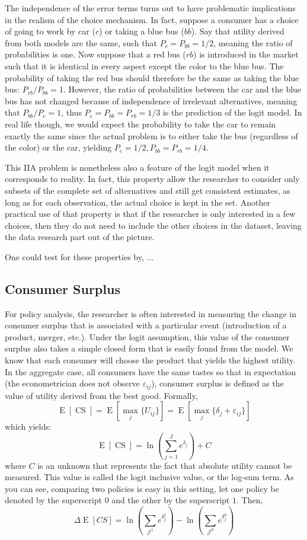 \documentclass[12pt]{report}
\newcommand{\E}[1]{\operatorname{E}\left[#1\right]}
\begin{document}
The independence of the error terms turns out to have problematic implications in the realism of the choice mechanism. In fact, suppose a consumer has a choice of going to work by car ($c$) or taking a blue bus ($bb$). Say that utility derived from both models are the same, such that $P_c = P_{bb} = 1/2$, meaning the ratio of probabilities is one. Now suppose that a red bus ($rb$) is introduced in the market such that it is identical in every aspect except the color to the blue bus. The probability of taking the red bus should therefore be the same as taking the blue bus: $P_{rb}/P_{bb} = 1$. However, the ratio of probabilities between the car and the blue bus has not changed because of independence of irrelevant alternatives, meaning that $P_{bb}/P_{c} = 1$, thus $P_c = P_{bb} = P_{rb} = 1/3$ is the prediction of the logit model. In real life though, we would expect the probability to take the car to remain exactly the same since the actual problem is to either take the bus (regardless of the color) or the car, yielding $P_c = 1/2, P_{bb}=P_{rb} = 1/4 $.

This IIA problem is nonetheless also a feature of the logit model when it corresponds to reality. In fact, this property allow the researcher to consider only subsets of the complete set of alternatives and still get consistent estimates, as long as for each observation, the actual choice is kept in the set. Another practical use of that property is that if the researcher is only interested in a few choices, then they do not need to include the other choices in the dataset, leaving the data research part out of the picture.

One could test for these properties by, ...

\subsection{Consumer Surplus}

For policy analysis, the researcher is often interested in measuring the change in consumer surplus that is associated with a particular event (introduction of a product, merger, etc.). Under the logit assumption, this value of the consumer surplus also takes a simple closed form that is easily found from the model. We know that each consumer will choose the product that yields the highest utility. In the aggregate case, all consumers have the same tastes so that in expectation (the econometrician does not observe $\varepsilon_{ij}$), consumer surplus is defined as the value of utility derived from the best good. Formally, $$\E{\operatorname{CS}} = \E{\max_{j} \{U_{ij}\}} = \E{\max_{j} \{\delta_{j} + \varepsilon_{ij} \}}$$ which yields: $$\E{\operatorname{CS}} = \ln\left(\sum_{j=1}^{J} e^{\delta_j} \right) + C $$ where $C$ is an unknown that represents the fact that absolute utility cannot be measured. This value is called the logit inclusive value, or the log-sum term. As you can see, comparing two policies is easy in this setting, let one policy be denoted by the superscript $0$ and the other by the superscript $1$. Then, $$\Delta\E{CS} = \ln\left(\sum_{\mathcal{J}^1} e^{\delta_j^1} \right) - \ln\left(\sum_{\mathcal{J}^0} e^{\delta_j^0} \right) $$
\end{document}
